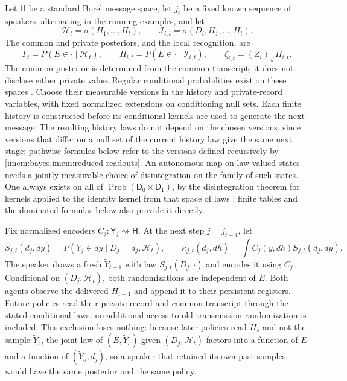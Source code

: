 Let $\mathsf H$ be a standard Borel message space, let $j_t$ be a fixed known sequence of speakers, alternating in the running examples, and let
\begin{equation}
 \mathcal H_t=\sigma(H_1,\ldots,H_t),\qquad
 \mathcal I_{i,t}=\sigma(D_i,H_1,\ldots,H_t).
 \label{imem:information}
\end{equation}
The common and private posteriors, and the local recognition, are
\begin{equation}
 \Gamma_t=P(E\in\cdot\mid\mathcal H_t),\qquad
 \Pi_{i,t}=P(E\in\cdot\mid\mathcal I_{i,t}),\qquad
 \zeta_{i,t}=(Z_i)_\#\Pi_{i,t}.
 \label{imem:posteriors}
\end{equation}
The common posterior is determined from the common transcript; it does not disclose either private value. Regular conditional probabilities exist on these spaces \citep{Kallenberg2021}. Choose their measurable versions in the history and private-record variables, with fixed normalized extensions on conditioning null sets. Each finite history is constructed before its conditional kernels are used to generate the next message. The resulting history laws do not depend on the chosen versions, since versions that differ on a null set of the current history law give the same next stage; pathwise formulas below refer to the versions defined recursively by \cref{imem:bayes,imem:reduced-readouts}. An autonomous map on law-valued states needs a jointly measurable choice of disintegration on the family of such states. One always exists on all of $\operatorname{Prob}(\mathsf D_0\times\mathsf D_1)$, by the disintegration theorem for kernels applied to the identity kernel from that space of laws \citep{Kallenberg2021}; finite tables and the dominated formulas below also provide it directly.

Fix normalized encoders $C_j:\mathsf Y_j\rightsquigarrow\mathsf H$. At the next step $j=j_{t+1}$, let
\begin{equation}
 S_{j,t}(d_j,dy)=P(Y_j\in dy\mid D_j=d_j,\mathcal H_t),\qquad
 \kappa_{j,t}(d_j,dh)=\int C_j(y,dh)S_{j,t}(d_j,dy).
 \label{imem:message-kernel}
\end{equation}
The speaker draws a fresh $\widetilde Y_{t+1}$ with law $S_{j,t}(D_j,\cdot)$ and encodes it using $C_j$. Conditional on $(D_j,\mathcal H_t)$, both randomizations are independent of $E$. Both agents observe the delivered $H_{t+1}$ and append it to their persistent registers. Future policies read their private record and common transcript through the stated conditional laws; no additional access to old transmission randomization is included. This exclusion loses nothing: because later policies read $H_s$ and not the sample $\widetilde Y_s$, the joint law of $(E,\widetilde Y_s)$ given $(D_j,\mathcal H_t)$ factors into a function of $E$ and a function of $(\widetilde Y_s,d_j)$, so a speaker that retained its own past samples would have the same posterior and the same policy.

